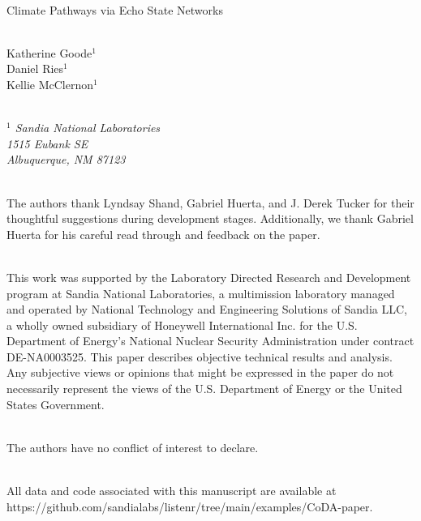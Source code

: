 \documentclass[AMS,STIX2COL]{WileyNJD-v2}
\begin{document}
\begin{titlepage}

	\vspace{0.75\baselineskip}
	
	\vspace{1cm}
	
	\\
	\noindent Climate Pathways via Echo State Networks
	\vspace{0.5cm}
	
	\\
	Katherine Goode$^1$ \\ Daniel Ries$^1$ \\ Kellie McClernon$^1$
	\vspace{0.5cm}
	
	\\
	\noindent \textit{$^1$ Sandia National Laboratories \\ 1515 Eubank SE \\ Albuquerque, NM 87123}
	\vspace{0.5cm}
	
	\\
	\noindent The authors thank Lyndsay Shand, Gabriel Huerta, and J. Derek Tucker for their thoughtful suggestions during development stages. Additionally, we thank Gabriel Huerta for his careful read through and feedback on the paper.
	\vspace{0.5cm}
	
	\\
	\noindent This work was supported by the Laboratory Directed Research and Development program at Sandia National Laboratories, a multimission laboratory managed and operated by National Technology and Engineering Solutions of Sandia LLC, a wholly owned subsidiary of Honeywell International Inc. for the U.S. Department of Energy's National Nuclear Security Administration under contract DE-NA0003525. This paper describes objective technical results and analysis. Any subjective views or opinions that might be expressed in the paper do not necessarily represent the views of the U.S. Department of Energy or the United States Government.
	\vspace{0.5cm}

	\\
	\noindent The authors have no conflict of interest to declare.
	\vspace{0.5cm}
	
	\\
	\noindent All data and code associated with this manuscript are available at https://github.com/sandialabs/listenr/tree/main/examples/CoDA-paper.
	
	\vfill
	
\end{titlepage}
\end{document}

